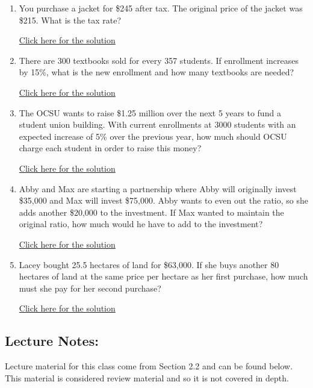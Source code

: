 \documentclass[
]{book}
\providecommand{\tightlist}{%
  \setlength{\itemsep}{0pt}\setlength{\parskip}{0pt}}
\begin{document}
\begin{enumerate}
\def\labelenumi{\arabic{enumi}.}
\tightlist
\item
  You purchase a jacket for \$245 after tax. The original price of the jacket was \$215. What is the tax rate?

  \href{https://youtu.be/YnkjwUr_YFQ}{Click here for the solution}
\item
  There are 300 textbooks sold for every 357 students. If enrollment increases by 15\%, what is the new enrollment and how many textbooks are needed?

  \href{https://youtu.be/clGY-9mrAFU}{Click here for the solution}
\item
  The OCSU wants to raise \$1.25 million over the next 5 years to fund a student union building. With current enrollments at 3000 students with an expected increase of 5\% over the previous year, how much should OCSU charge each student in order to raise this money?

  \href{https://youtu.be/Aum_ZyukTHM}{Click here for the solution}
\item
  Abby and Max are starting a partnership where Abby will originally invest \$35,000 and Max will invest \$75,000. Abby wants to even out the ratio, so she adds another \$20,000 to the investment. If Max wanted to maintain the original ratio, how much would he have to add to the investment?

  \href{https://youtu.be/vrGvTSZJ8uI}{Click here for the solution}
\item
  Lacey bought 25.5 hectares of land for \$63,000. If she buys another 80 hectares of land at the same price per hectare as her first purchase, how much must she pay for her second purchase?

  \href{https://youtu.be/PSSyIpvduZs}{Click here for the solution}
\end{enumerate}

\subsection*{Lecture Notes:}\label{lecture-notes-2}

Lecture material for this class come from Section 2.2 and can be found below. This material is considered review material and so it is not covered in depth.
\end{document}
